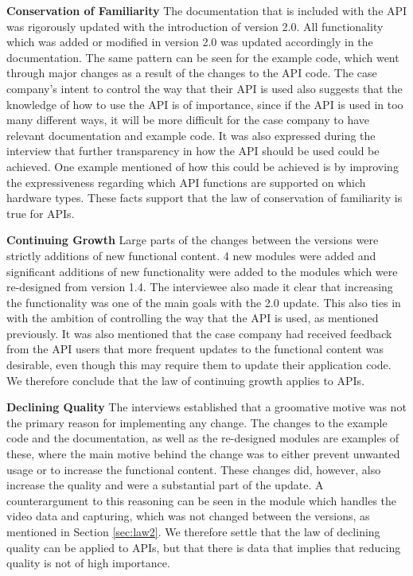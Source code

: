 \documentclass{sig-alternate}
\begin{document}
\smallskip \noindent
\textbf{Conservation of Familiarity} 
The documentation that is included with the API was rigorously updated with the introduction of version 2.0. All functionality which was added or modified in version 2.0 was updated accordingly in the documentation. The same pattern can be seen for the example code, which went through major changes as a result of the changes to the API code. The case company's intent to control the way that their API is used also suggests that the knowledge of how to use the API is of importance, since if the API is used in too many different ways, it will be more difficult for the case company to have relevant documentation and example code. It was also expressed during the interview that further transparency in how the API should be used could be achieved. One example mentioned of how this could be achieved is by improving the expressiveness regarding which API functions are supported on which hardware types. These facts support that the law of conservation of familiarity is true for APIs. 

\smallskip \noindent
\textbf{Continuing Growth} 
Large parts of the changes between the versions were strictly additions of new functional content. 4 new modules were added and significant additions of new functionality were added to the modules which were re-designed from version 1.4. The interviewee also made it clear that increasing the functionality was one of the main goals with the 2.0 update. This also ties in with the ambition of controlling the way that the API is used, as mentioned previously. It was also mentioned that the case company had received feedback from the API users that more frequent updates to the functional content was desirable, even though this may require them to update their application code. We therefore conclude that the law of continuing growth applies to APIs. 

\smallskip \noindent
\textbf{Declining Quality} 
The interviews established that a groomative motive was not the primary reason for implementing any change. The changes to the example code and the documentation, as well as the re-designed modules are examples of these, where the main motive behind the change was to either prevent unwanted usage or to increase the functional content. These changes did, however, also increase the quality and were a substantial part of the update. A counterargument to this reasoning can be seen in the module which handles the video data and capturing, which was not changed between the versions, as mentioned in Section \ref{sec:law2}. We therefore settle that the law of declining quality can be applied to APIs, but that there is data that implies that reducing quality is not of high importance. 
\end{document}

